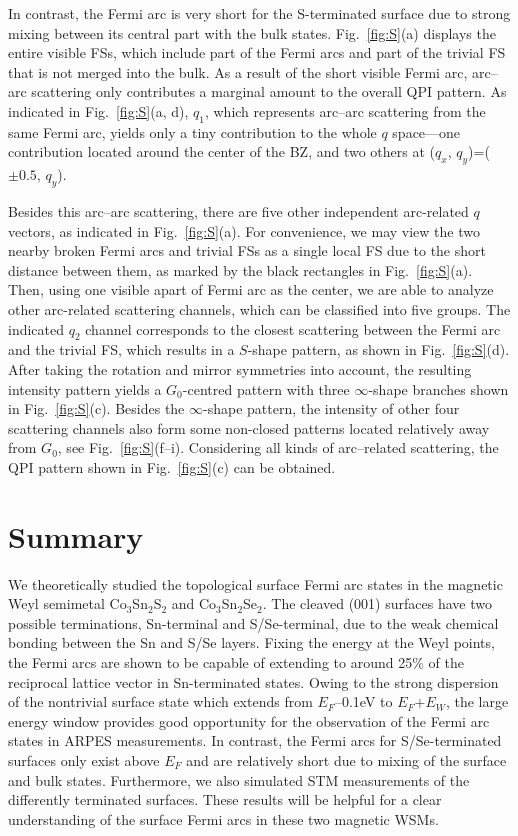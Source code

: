 \documentclass[aps,prb,reprint,superscriptaddress,amssymb,amsmath]{revtex4-1}
\begin{document}
In contrast, the Fermi arc is very short for the S-terminated surface due to strong mixing between its central part with the bulk states. 
Fig.~\ref{fig:S}(a) displays the entire visible FSs, which include part of the Fermi arcs and part of the trivial FS that is not merged into the bulk. 
As a result of the short visible Fermi arc, arc--arc scattering only contributes a marginal amount to the overall QPI pattern. 
As indicated in Fig.~\ref{fig:S}(a, d), $q_1$, which represents arc--arc scattering from the same Fermi arc, 
yields only a tiny contribution to the whole $q$ space---one contribution located around the center of the BZ, 
and two others at ($q_x$, $q_y$)=($\pm0.5$, $q_y$).

Besides this arc--arc scattering, there are five other independent arc-related $q$ vectors, as indicated in Fig.~\ref{fig:S}(a). 
For convenience, we may view the two nearby broken Fermi arcs and trivial FSs as a single local FS due to the short distance between them, 
as marked by the black rectangles in Fig.~\ref{fig:S}(a). Then, using one visible apart of Fermi arc as the center, 
we are able to analyze other arc-related scattering channels, which can be classified into five groups. 
The indicated $q_2$ channel corresponds to the closest scattering between the Fermi arc and the trivial FS, 
which results in a $S$-shape pattern, as shown in Fig.~\ref{fig:S}(d). 
After taking the rotation and mirror symmetries into account,  
the resulting intensity pattern yields a $G_0$-centred pattern with three $\infty$-shape branches shown in Fig.~\ref{fig:S}(c). 
Besides the $\infty$-shape pattern, the intensity of other four scattering channels also form some non-closed 
patterns located relatively away from $G_0$, see Fig.~\ref{fig:S}(f--i). 
Considering all kinds of arc--related scattering, the QPI pattern shown in Fig.~\ref{fig:S}(c) can be obtained.

\section{Summary}
We theoretically studied the topological surface Fermi arc 
states in the magnetic Weyl semimetal Co$_3$Sn$_2$S$_2$ and 
Co$_3$Sn$_2$Se$_2$. The cleaved (001) surfaces have two possible 
terminations, Sn-terminal and S/Se-terminal, due to the weak 
chemical bonding between the Sn and S/Se layers. 
Fixing the energy at the Weyl points, the
 Fermi arcs are shown to be capable of extending to around 25\% 
of the reciprocal lattice vector in Sn-terminated states. 
Owing to the strong dispersion of the nontrivial surface state 
which extends from $E_F$--0.1eV to $E_F$+$E_W$, 
the large energy window provides good opportunity for the 
observation of the Fermi arc states in ARPES measurements. 
In contrast, the Fermi arcs for S/Se-terminated surfaces only exist above $E_F$ 
and are relatively short due to mixing of the surface and bulk states. 
Furthermore, we also simulated STM measurements of the differently terminated surfaces. 
These results will be helpful for a clear understanding of the 
surface Fermi arcs in these two magnetic WSMs.
\end{document}
